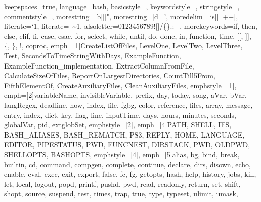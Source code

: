 {%
keepspaces=true,                    %
language=bash,
basicstyle=\ttfamily\scriptsize\color{basic-color},
keywordstyle=\color{keywords-color},
stringstyle=\color{strings-color},
commentstyle=\color{comment-color},
morestring=[b][\color{strings-color}]{"},
morestring=[d][\color{strings-color}]{'},
moredelim=[is][\color{basic-color}]{|+}{+|}, %
literate={`}{\textasciigrave}1, %
literate={~}{{\textasciitilde}}1,
alsoletter=0123456789![]/\{\}.:+, %
morekeywords={if, then, else, elif, fi, case, esac, for, select, while, until, do, done, in, function, time, [[, ]], \{, \}, !, coproc}, %
emph=[1]{CreateListOfFiles, LevelOne, LevelTwo, LevelThree, Test, SecondsToTimeStringWithDays, ExampleFunction,
         ExampleFunction_implementation, ExtractColumnFromFile, CalculateSizeOfFiles, ReportOnLargestDirectories,
         CountTill5From, FifthElementOf, CreateAuxiliaryFiles, CleanAuxiliaryFiles},
emphstyle=[1]{\color{functions-color}}, %
emph=[2]{variableName, invisibleVariable, prefix, day, today, song, aVar, bVar, langRegex, deadline, now,
         index, file, fgbg, color, reference, files, array, message, entry, index, dict, key, flag, line, inputTime,
         days, hours, minutes, seconds, globalVar, pid, extglobSet},
emphstyle=[2]{\color{variables-color}}, %
emph=[4]{PATH, SHELL, IFS, BASH_ALIASES, BASH_REMATCH, PS3, REPLY, HOME, LANGUAGE, EDITOR, PIPESTATUS, PWD, FUNCNEST,
         DIRSTACK, PWD, OLDPWD, SHELLOPTS, BASHOPTS},
emphstyle=[4]{\color{environment-color}}, %
emph=[5]{alias, bg, bind, break, builtin, cd, command, compgen, complete, continue, declare, dirs, disown, echo, enable, eval,
         exec, exit, export, false, fc, fg, getopts, hash, help, history, jobs, kill, let, local, logout, popd, printf, pushd, pwd,
         read, readonly, return, set, shift, shopt, source, suspend, test, times, trap, true, type, typeset, ulimit, umask,
}}
